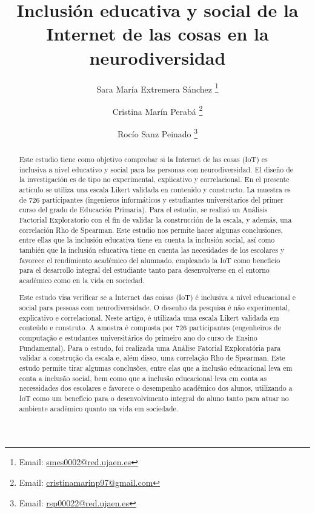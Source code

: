 \documentclass[spanish]{textolivre}
\title{Inclusión educativa y social de la Internet de las cosas en la neurodiversidad}
\author[1]{Sara María Extremera Sánchez \orcid{0000-0002-0255-6067} \thanks{Email: \href{mailto:smes0002@red.ujaen.es}{smes0002@red.ujaen.es}}}
\author[1]{Cristina Marín Perabá \orcid{0000-0002-1329-9203} \thanks{Email: \href{mailto:cristinamarinp97@gmail.com}{cristinamarinp97@gmail.com}}}
\author[1]{Rocío Sanz Peinado \orcid{0000-0002-6758-8860} \thanks{Email: \href{mailto:rsp00022@red.ujaen.es}{rsp00022@red.ujaen.es}}}
\affil[1]{Universidad de Jaén, Facultad de Humanidades y Ciencias de la Educación, Departamento Pedagogía, Jaén, España.}
\begin{document}
\maketitle

\begin{polyabstract}
\begin{abstract}
Este estudio tiene como objetivo comprobar si la Internet de las cosas (IoT) es inclusiva a nivel educativo y social para las personas con neurodiversidad. El diseño de la investigación es de tipo no experimental, explicativo y correlacional. En el presente artículo se utiliza una escala Likert validada en contenido y constructo. La muestra es de 726 participantes (ingenieros informáticos y estudiantes universitarios del primer curso del grado de Educación Primaria). Para el estudio, se realizó un Análisis Factorial Exploratorio con el fin de validar la construcción de la escala, y además, una correlación Rho de Spearman. Este estudio nos permite hacer algunas conclusiones, entre ellas que la inclusión educativa tiene en cuenta la inclusión social, así como también que la inclusión educativa tiene en cuenta las necesidades de los escolares y favorece el rendimiento académico del alumnado, empleando la IoT como beneficio para el desarrollo integral del estudiante tanto para desenvolverse en el entorno académico como en la vida en sociedad.

\end{abstract}

\begin{portuguese}
\begin{abstract}
Este estudo visa verificar se a Internet das coisas (IoT) é inclusiva a nível educacional e social para pessoas com neurodiversidade. O desenho da pesquisa é não experimental, explicativo e correlacional. Neste artigo, é utilizada uma escala Likert validada em conteúdo e construto. A amostra é composta por 726 participantes (engenheiros de computação e estudantes universitários do primeiro ano do curso de Ensino Fundamental). Para o estudo, foi realizada uma Análise Fatorial Exploratória para validar a construção da escala e, além disso, uma correlação Rho de Spearman. Este estudo permite tirar algumas conclusões, entre elas que a inclusão educacional leva em conta a inclusão social, bem como que a inclusão educacional leva em conta as necessidades dos escolares e favorece o desempenho acadêmico dos alunos, utilizando a IoT como um benefício para o desenvolvimento integral do aluno tanto para atuar no ambiente acadêmico quanto na vida em sociedade.


\end{abstract}
\end{portuguese}
\end{polyabstract}
\end{document}
